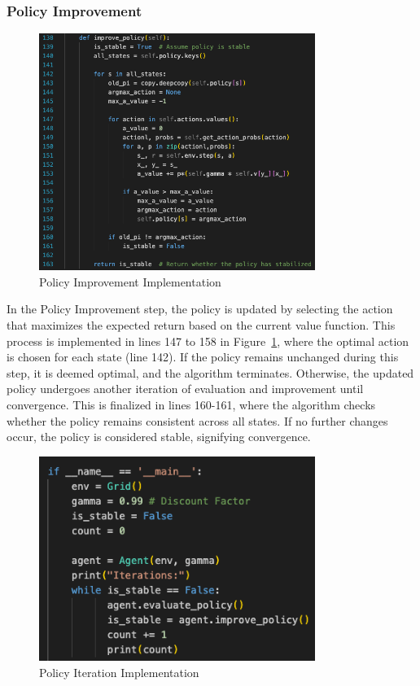 \subsubsection{Policy Improvement}

\begin{figure}[H]
    \centering
    \includegraphics[width=0.8\textwidth]{images/policy_impr_impl.png}
    \caption{Policy Improvement Implementation}
    \label{pi_impl}
\end{figure}

\noindent In the Policy Improvement step, the policy is updated by selecting the action that maximizes the expected return based on the current value function. This process is implemented in lines 147 to 158 in Figure~\ref{pi_impl}, where the optimal action is chosen for each state (line 142). If the policy remains unchanged during this step, it is deemed optimal, and the algorithm terminates. Otherwise, the updated policy undergoes another iteration of evaluation and improvement until convergence. This is finalized in lines 160-161, where the algorithm checks whether the policy remains consistent across all states. If no further changes occur, the policy is considered stable, signifying convergence.

\begin{figure}[H]
    \centering
    \includegraphics[width=0.8\textwidth]{images/policy_iter_impl.png}
    \caption{Policy Iteration Implementation}
    \label{pit_impl}
\end{figure}


